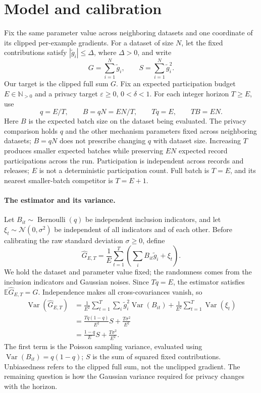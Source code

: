 \documentclass[11pt]{article}
\theoremstyle{remark}
\newcommand{\N}{\mathbb N}
\newcommand{\E}{\mathbb E}
\newcommand{\Normal}{\mathcal N}
\begin{document}
\section{Model and calibration}\label{sec:model}
Fix the same parameter value across neighboring datasets and one coordinate
of its clipped per-example gradients. For a dataset of size $N$, let the fixed contributions satisfy
$|\widetilde g_i|\leq\Delta$, where $\Delta>0$, and write
\[
 G=\sum_{i=1}^N\widetilde g_i,\qquad
 S=\sum_{i=1}^N\widetilde g_i^2.
\]
Our target is the clipped full sum $G$. Fix an expected participation budget
$E\in\N_{>0}$ and a privacy target $\varepsilon\geq0$, $0<\delta<1$.
For each integer horizon $T\geq E$, use
\begin{equation}\label{eq:rate}
 q=E/T,\qquad B=qN=EN/T,\qquad Tq=E,\qquad TB=EN.
\end{equation}
Here $B$ is the expected batch size on the dataset being evaluated. The
privacy comparison holds $q$ and the other mechanism parameters fixed across
neighboring datasets; $B=qN$ does not prescribe changing $q$ with dataset
size. Increasing $T$ produces smaller
expected batches while preserving $EN$ expected record participations across
the run. Participation is independent across records and releases;
$E$ is not a deterministic participation count. Full batch is $T=E$, and
its nearest smaller-batch competitor is $T=E+1$.

\paragraph{The estimator and its variance.}
Let $B_{it}\sim\operatorname{Bernoulli}(q)$ be independent inclusion
indicators, and let $\xi_t\sim\Normal(0,\sigma^2)$ be independent of all
indicators and of each other. Before calibrating the raw standard deviation
$\sigma\geq0$, define
\[
 \widehat G_{E,T}=\frac1E\sum_{t=1}^T
       \left(\sum_i B_{it}\widetilde g_i+\xi_t\right).
\]
We hold the dataset and parameter value fixed; the randomness comes from the
inclusion indicators and Gaussian noises. Since $Tq=E$, the estimator satisfies
$\E\widehat G_{E,T}=G$. Independence makes all cross-covariances vanish, so
\begin{equation}\label{eq:uncalibrated-variance}
 \begin{aligned}
 \operatorname{Var}(\widehat G_{E,T})
 &=\frac1{E^2}\sum_{t=1}^T\sum_i
   \widetilde g_i^2\operatorname{Var}(B_{it})
   +\frac1{E^2}\sum_{t=1}^T\operatorname{Var}(\xi_t)\\
 &=\frac{Tq(1-q)}{E^2}S+\frac{T\sigma^2}{E^2}\\
 &=\frac{1-q}{E}S+\frac{T\sigma^2}{E^2}.
 \end{aligned}
\end{equation}
The first term is the Poisson sampling variance, evaluated using
$\operatorname{Var}(B_{it})=q(1-q)$; $S$ is the sum of squared fixed
contributions.
Unbiasedness refers to the clipped full sum, not the unclipped gradient.
The remaining question is how the Gaussian variance required for privacy
changes with the horizon.
\end{document}
